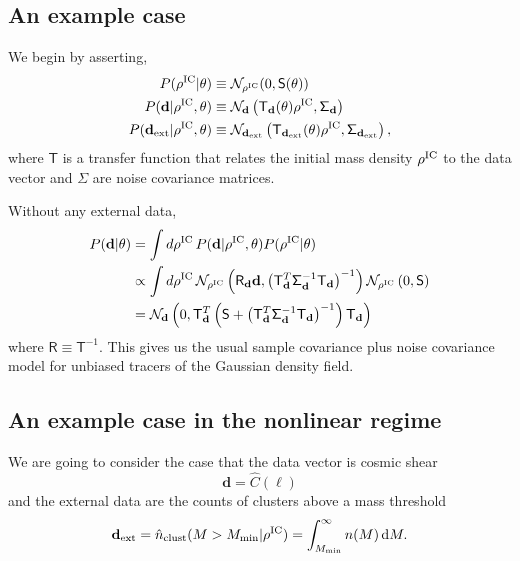 \documentclass[preprint]{aastex}
\newcommand{\half}{\frac{1}{2}}
\newcommand{\data}{\mathbf{d}}
\newcommand{\dataext}{\data_{\rm ext}}
\newcommand{\rhoic}{\rho^{\rm IC}}
\newcommand{\normdist}{\mathcal{N}}
\newcommand{\smat}{\mathsf{S}}
\newcommand{\noisemat}{\mathsf{\Sigma}}
\newcommand{\transfer}{\mathsf{T}}
\newcommand{\invtransfer}{\mathsf{R}}
\begin{document}
\subsection{An example case}

We begin by asserting,
\begin{align}
	P(\rhoic | \theta) &\equiv \normdist_{\rhoic}(0, \smat(\theta))
	\\
	P(\data | \rhoic, \theta) &\equiv
	\normdist_{\data}\left(\transfer_{\data}(\theta)\rhoic, \noisemat_{\data}\right)
	\\
	P(\dataext | \rhoic, \theta) &\equiv
	\normdist_{\dataext}\left(\transfer_{\dataext}(\theta)\rhoic, \noisemat_{\dataext}\right),
\end{align}
where $\transfer$ is a transfer function that relates the initial mass density $\rhoic$ 
to the data vector and $\noisemat$ are noise covariance matrices.

Without any external data,
\begin{align}
	P(\data|\theta) &= 
	\int d\rhoic\, P(\data | \rhoic,\theta) P(\rhoic|\theta)
	\notag\\
	&\propto \int d\rhoic\, 
	\normdist_{\rhoic} \left(
	\invtransfer_{\data} \data,
	\left(\transfer_{\data}^{T} \noisemat_{\data}^{-1} \transfer_{\data}\right)^{-1}
	\right)
	\normdist_{\rhoic} \left(
	0, \smat
	\right)
	\notag\\
	&= \normdist_{\data} \left(
	0,
	\transfer^{T}_{\data}
	\left(
	\smat +
	\left(\transfer_{\data}^{T} \noisemat_{\data}^{-1} \transfer_{\data}\right)^{-1}
	\right)
	\transfer_{\data}
	\right)
\end{align}
where $\invtransfer \equiv \transfer^{-1}$.
This gives us the usual sample covariance plus noise covariance model for unbiased 
tracers of the Gaussian density field.

\subsection{An example case in the nonlinear regime}

We are going to consider the case that the data vector is cosmic shear
\begin{equation}
	\data = \hat{C}(\ell)
\end{equation}
and the external data are the counts of clusters above a mass threshold
\begin{equation}
	\dataext = \hat{n}_\text{clust}(M>M_\text{min} | \rho^\text{IC}) =
	\int_{M_\text{min}}^{\infty} n(M)\,\mathrm{d}M.
\end{equation}
\end{document}
